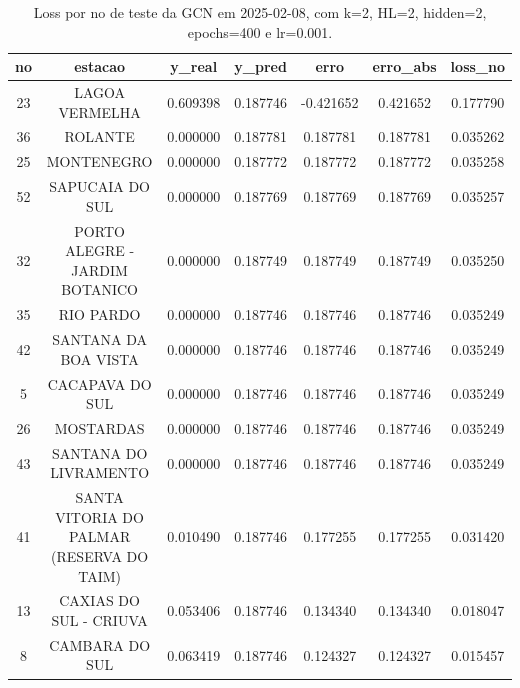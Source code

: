 \begin{table}[h]
\centering
\caption{Loss por no de teste da GCN em 2025-02-08, com k=2, HL=2, hidden=2, epochs=400 e lr=0.001.}
\label{tab:gcn_loss_k2_hl2_h2_e400_d20250208}
\begin{tabular}{ccccccc}
\toprule
no & estacao & y\_real & y\_pred & erro & erro\_abs & loss\_no \\
\midrule
23 & LAGOA VERMELHA & 0.609398 & 0.187746 & -0.421652 & 0.421652 & 0.177790 \\
36 & ROLANTE & 0.000000 & 0.187781 & 0.187781 & 0.187781 & 0.035262 \\
25 & MONTENEGRO & 0.000000 & 0.187772 & 0.187772 & 0.187772 & 0.035258 \\
52 & SAPUCAIA DO SUL & 0.000000 & 0.187769 & 0.187769 & 0.187769 & 0.035257 \\
32 & PORTO ALEGRE - JARDIM BOTANICO & 0.000000 & 0.187749 & 0.187749 & 0.187749 & 0.035250 \\
35 & RIO PARDO & 0.000000 & 0.187746 & 0.187746 & 0.187746 & 0.035249 \\
42 & SANTANA DA BOA VISTA & 0.000000 & 0.187746 & 0.187746 & 0.187746 & 0.035249 \\
5 & CACAPAVA DO SUL & 0.000000 & 0.187746 & 0.187746 & 0.187746 & 0.035249 \\
26 & MOSTARDAS & 0.000000 & 0.187746 & 0.187746 & 0.187746 & 0.035249 \\
43 & SANTANA DO LIVRAMENTO & 0.000000 & 0.187746 & 0.187746 & 0.187746 & 0.035249 \\
41 & SANTA VITORIA DO PALMAR (RESERVA DO TAIM) & 0.010490 & 0.187746 & 0.177255 & 0.177255 & 0.031420 \\
13 & CAXIAS DO SUL - CRIUVA & 0.053406 & 0.187746 & 0.134340 & 0.134340 & 0.018047 \\
8 & CAMBARA DO SUL & 0.063419 & 0.187746 & 0.124327 & 0.124327 & 0.015457 \\
\bottomrule
\end{tabular}
\end{table}
